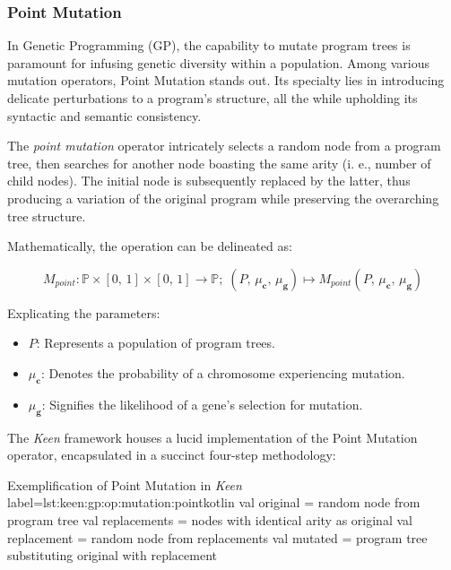 \subsubsection{Point Mutation}
\label{sec:keen:gp:op:mutation:point}

  In Genetic Programming (GP), the capability to mutate program trees is 
  paramount for infusing genetic diversity within a population. Among various 
  mutation operators, Point Mutation stands out. Its specialty lies in 
  introducing delicate perturbations to a program's structure, all the while 
  upholding its syntactic and semantic consistency.

  \begin{definition}
    The \textit{point mutation} operator intricately selects a random node from 
    a program tree, then searches for another node boasting the same arity (i.
    e., number of child nodes). The initial node is subsequently replaced by 
    the latter, thus producing a variation of the original program while 
    preserving the overarching tree structure.

    Mathematically, the operation can be delineated as:

    \begin{equation}
      M_{point}: \mathbb{P} \times [0,\, 1] \times [0,\, 1] \to \mathbb{P};\;
      (P,\, \mu_\textbf{c},\, \mu_\textbf{g}) 
        \mapsto M_{point}(P,\, \mu_\textbf{c},\, \mu_\textbf{g})
    \end{equation}

    Explicating the parameters:

    \begin{itemize}
      \item \(P\): Represents a population of program trees.
      \item \(\mu_\textbf{c}\): Denotes the probability of a chromosome 
        experiencing mutation.
      \item \(\mu_\textbf{g}\): Signifies the likelihood of a gene's selection 
        for mutation.
    \end{itemize}
  \end{definition}

  The \textit{Keen} framework houses a lucid implementation of the Point 
  Mutation operator, encapsulated in a succinct four-step methodology:

  \begin{code}{
    Exemplification of Point Mutation in \textit{Keen}
  }{label=lst:keen:gp:op:mutation:point}{kotlin}
    val original = random node from program tree
    val replacements = nodes with identical arity as original
    val replacement = random node from replacements
    val mutated = program tree substituting original with replacement
  \end{code}

